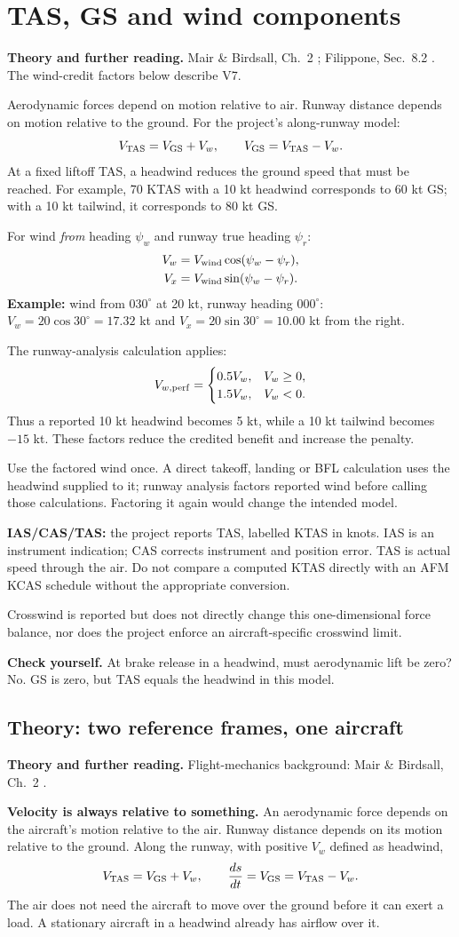 \documentclass[11pt,letterpaper]{article}
\newcommand{\topic}[1]{\clearpage\section{#1}}
\newcommand{\theorypage}[1]{\clearpage\subsection*{\color{navy}\thesection\enspace Theory: #1}}
\newcommand{\reading}[1]{{\small\color{navy}\textbf{Theory and further reading.} #1\par}\vspace{3pt}}
\newcommand{\selfcheck}[1]{\par\textbf{Check yourself.} #1\par}
\begin{document}
\topic{TAS, GS and wind components}
\reading{Mair \& Birdsall, Ch.~2 \cite{mair}; Filippone, Sec.~8.2 \cite{filippone}. The wind-credit factors below describe V7.}
Aerodynamic forces depend on motion relative to air. Runway distance depends on
motion relative to the ground. For the project's along-runway model:
\[
V_{\rm TAS}=V_{\rm GS}+V_w,\qquad V_{\rm GS}=V_{\rm TAS}-V_w.
\]
At a fixed liftoff TAS, a headwind reduces the ground speed that must be reached.
For example, 70 KTAS with a 10 kt headwind corresponds to 60 kt GS; with a 10 kt
tailwind, it corresponds to 80 kt GS.

For wind \emph{from} heading $\psi_w$ and runway true heading $\psi_r$:
\begin{align*}
V_w&=V_{\rm wind}\cos(\psi_w-\psi_r),\\
V_x&=V_{\rm wind}\sin(\psi_w-\psi_r).
\end{align*}
\textbf{Example:} wind from $030^\circ$ at 20 kt, runway heading $000^\circ$:
$V_w=20\cos30^\circ=17.32$ kt and $V_x=20\sin30^\circ=10.00$ kt from the right.

The runway-analysis calculation applies:
\[
V_{w,\rm perf}=\begin{cases}0.5V_w,&V_w\ge0,\\1.5V_w,&V_w<0.\end{cases}
\]
Thus a reported 10 kt headwind becomes 5 kt, while a 10 kt tailwind becomes
$-15$ kt. These factors reduce the credited benefit and increase the penalty.
\begin{keyidea}
Use the factored wind once. A direct takeoff, landing or BFL calculation uses
the headwind supplied to it; runway analysis factors reported wind before
calling those calculations. Factoring it again would change the intended model.
\end{keyidea}
\textbf{IAS/CAS/TAS:} the project reports TAS, labelled KTAS in knots. IAS is an
instrument indication; CAS corrects instrument and position error. TAS is actual
speed through the air. Do not compare a computed KTAS directly with an AFM KCAS
schedule without the appropriate conversion.

Crosswind is reported but does not directly change this one-dimensional force
balance, nor does the project enforce an aircraft-specific crosswind limit.
\selfcheck{At brake release in a headwind, must aerodynamic lift be zero? No.
GS is zero, but TAS equals the headwind in this model.}


\theorypage{two reference frames, one aircraft}
\reading{Flight-mechanics background: Mair \& Birdsall, Ch.~2 \cite{mair}.}
\textbf{Velocity is always relative to something.}
An aerodynamic force depends on the aircraft's motion relative to the air.
Runway distance depends on its motion relative to the ground. Along the runway,
with positive $V_w$ defined as headwind,
\[
V_{\rm TAS}=V_{\rm GS}+V_w,\qquad
\frac{ds}{dt}=V_{\rm GS}=V_{\rm TAS}-V_w.
\]
The air does not need the aircraft to move over the ground before it can exert
a load. A stationary aircraft in a headwind already has airflow over it.
\end{document}
